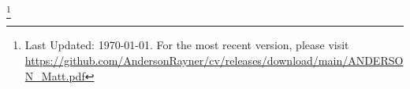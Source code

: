 \documentclass[12pt,letter,sans]{moderncv}        %
\newcommand\blfootnote[1]{%
  \begingroup
  \renewcommand\thefootnote{}\footnote{#1}%
  \addtocounter{footnote}{-1}%
  \endgroup
}
\begin{document}


%

\vfill
\enlargethispage{\footskip}
\blfootnote{Last Updated: \today.  For the most recent version, please visit \url{https://github.com/AndersonRayner/cv/releases/download/main/ANDERSON_Matt.pdf}}
\end{document}
